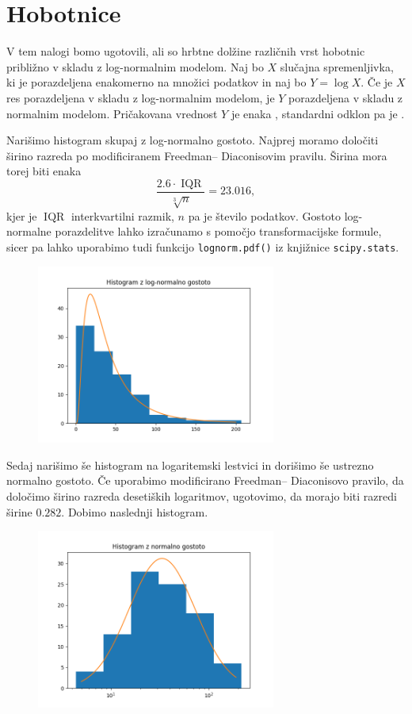 \documentclass[a4paper,12pt]{article}
\theoremstyle{definition}
\theoremstyle{plain}
\DeclareMathOperator*{\IQR}{IQR}
\begin{document}
\section{Hobotnice}
V tem nalogi bomo ugotovili, ali so hrbtne dolžine različnih vrst hobotnic približno v skladu z log-normalnim modelom. Naj bo $X$ slučajna spremenljivka, ki je porazdeljena enakomerno na množici podatkov in naj bo $Y = \log{X}$. Če je $X$ res porazdeljena v skladu z log-normalnim modelom, je $Y$ porazdeljena v skladu z normalnim modelom. Pričakovana vrednost $Y$ je enaka $ $, standardni odklon pa je $ $.

Narišimo histogram skupaj z log-normalno gostoto. Najprej moramo določiti širino razreda po modificiranem Freedman–
Diaconisovim pravilu. Širina mora torej biti enaka $$\frac{2.6 \cdot \IQR}{\sqrt[3]n} = 23.016,$$ kjer je $\IQR$ interkvartilni razmik, $n$ pa je število podatkov. Gostoto log-normalne porazdelitve lahko izračunamo s pomočjo transformacijske formule, sicer pa lahko uporabimo tudi funkcijo \verb+lognorm.pdf()+ iz knjižnice \verb+scipy.stats+.

\begin{figure}[H]
    \centering
    \label{fig:hist1}
    \includegraphics[width=0.7\textwidth]{Histogram1.png}
\end{figure}

Sedaj narišimo še histogram na logaritemski lestvici in dorišimo še ustrezno normalno gostoto. Če uporabimo modificirano Freedman–
Diaconisovo pravilo, da določimo širino razreda desetiških logaritmov, ugotovimo, da morajo biti razredi širine $0.282$. Dobimo naslednji histogram.

\begin{figure}[H]
    \centering
    \label{fig:hist1}
    \includegraphics[width=0.7\textwidth]{Histogram2.png}
\end{figure}
\end{document}
